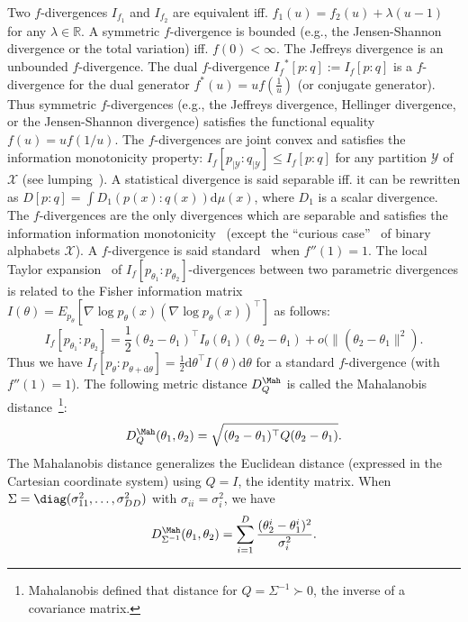 \documentclass[11pt]{article}
\def\calY{\mathcal{Y}}
\def\dmu{\mathrm{d}\mu}
\def\calX{\mathcal{X}}
\def\bbR{\mathbb{R}}
\def\calX{\mathcal{X}}
\def\dmu{\mathrm{d}\mu}
\def\dtheta{\mathrm{d}\theta}
\begin{document}

 


Two $f$-divergences $I_{f_1}$ and $I_{f_2}$ are equivalent iff. $f_1(u)=f_2(u)+\lambda (u-1)$ for any $\lambda\in\bbR$.
A symmetric $f$-divergence is bounded (e.g., the Jensen-Shannon divergence or the total variation) iff. $f(0)<\infty$. 
The Jeffreys divergence is an unbounded $f$-divergence.
The dual $f$-divergence ${I_f}^*[p:q]:=I_f[p:q]$ is a $f$-divergence for the dual generator $f^*(u)= u f\left(\frac{1}{u}\right)$ (or conjugate generator).
Thus symmetric $f$-divergences (e.g., the Jeffreys divergence, Hellinger divergence, or the Jensen-Shannon divergence) satisfies the functional equality $f(u)=uf(1/u)$.
The $f$-divergences are joint convex and satisfies the information monotonicity property:
$I_f[p_{|\calY}:q_{|\calY}]\leq I_f[p:q]$ for any partition $\calY$ of $\calX$ (see lumping~\cite{TutorialCsiszar-2004}).
A statistical divergence is said separable iff. it can be rewritten as $D[p:q]=\int D_1(p(x):q(x)) \dmu(x)$, where $D_1$ is a scalar divergence. The $f$-divergences are the only divergences which are separable and satisfies the information information monotonicity~\cite{IG-2016} (except the ``curious case''~\cite{fdivBinaryAlphabet-2014} of binary alphabets $\calX$).
A $f$-divergence is said standard~\cite{IG-2016} when $f''(1)=1$. 
The local Taylor expansion~\cite{CharacterizationDiv-1998} of $I_f[p_{\theta_1}:p_{\theta_2}]$-divergences between two parametric divergences is related to the Fisher information matrix $I(\theta)=E_{p_\theta}\left[\nabla \log p_\theta(x) (\nabla \log p_\theta(x))^\top\right]$ as follows:
$$
I_f[p_{\theta_1}:p_{\theta_2}]=\frac{1}{2}(\theta_2-\theta_1)^\top I_\theta(\theta_1)(\theta_2-\theta_1)+o(\|(\theta_2-\theta_1\|^2).
$$ 
Thus we have $I_f[p_{\theta}:p_{\theta+\dtheta}]=\frac{1}{2}\dtheta^\top I(\theta) \dtheta$ for a standard $f$-divergence (with $f''(1)=1$).
The following metric distance $D^\Mah_Q$ is called the Mahalanobis distance~\cite{Mahalanobis-1936}\footnote{Mahalanobis defined that distance for $Q=\Sigma^{-1}\succ 0$, the inverse of a covariance matrix.}:
$$
D^\Mah_Q(\theta_1,\theta_2)=\sqrt{(\theta_2-\theta_1)^\top Q(\theta_2-\theta_1)}.
$$
The  Mahalanobis distance generalizes the Euclidean distance (expressed in the Cartesian coordinate system) using $Q=I$, the identity matrix.
When $\Sigma=\diag(\sigma_{11}^2,\ldots, \sigma_{DD}^2)$ with $\sigma_{ii}=\sigma_i^2$, we have
$$
D^\Mah_{\Sigma^{-1}}(\theta_1,\theta_2)=\sum_{i=1}^D \frac{(\theta_2^i-\theta_1^i)^2}{\sigma_{i}^2}.
$$
\end{document}
